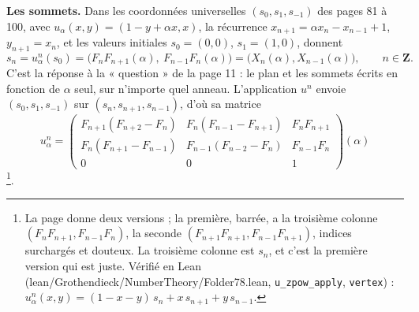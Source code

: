 \documentclass[11pt,a4paper]{article}
\begin{document}
\textbf{Les sommets.} Dans les coordonnées universelles $(s_0, s_1, s_{-1})$
des pages 81 à 100, avec $u_\alpha(x, y) = (1 - y + \alpha x, x)$, la
récurrence $x_{n+1} = \alpha x_n - x_{n-1} + 1$, $y_{n+1} = x_n$, et les
valeurs initiales $s_0 = (0, 0)$, $s_1 = (1, 0)$, donnent
\[
  s_n = u_\alpha^n(s_0) = \bigl(F_n F_{n+1}(\alpha),\ F_{n-1} F_n(\alpha)\bigr)
  = \bigl(X_n(\alpha), X_{n-1}(\alpha)\bigr), \qquad n \in \mathbf{Z} .
\]
C'est la réponse à la « question » de la page 11 : le plan et les sommets
écrits en fonction de $\alpha$ seul, sur n'importe quel anneau. L'application
$u^n$ envoie $(s_0, s_1, s_{-1})$ sur $(s_n, s_{n+1}, s_{n-1})$, d'où sa
matrice
\[
  u_\alpha^n = \begin{pmatrix}
    F_{n+1}(F_{n+2} - F_n) & F_n (F_{n-1} - F_{n+1}) & F_n F_{n+1} \\
    F_n (F_{n+1} - F_{n-1}) & F_{n-1}(F_{n-2} - F_n) & F_{n-1} F_n \\
    0 & 0 & 1
  \end{pmatrix}(\alpha)
\]
\footnote{La page donne deux versions ; la première, barrée, a la troisième
colonne $(F_n F_{n+1}, F_{n-1} F_n)$, la seconde $(F_{n+1} F_{n+1}, F_{n-1}
F_{n+1})$, indices surchargés et douteux. La troisième colonne est $s_n$, et
c'est la première version qui est juste. Vérifié en Lean
(lean/Grothendieck/NumberTheory/Folder78.lean, \texttt{u\_zpow\_apply}, \texttt{vertex}) :
$u_\alpha^n(x, y) = (1 - x - y)\,s_n + x\,s_{n+1} + y\,s_{n-1}$.}.
\end{document}
